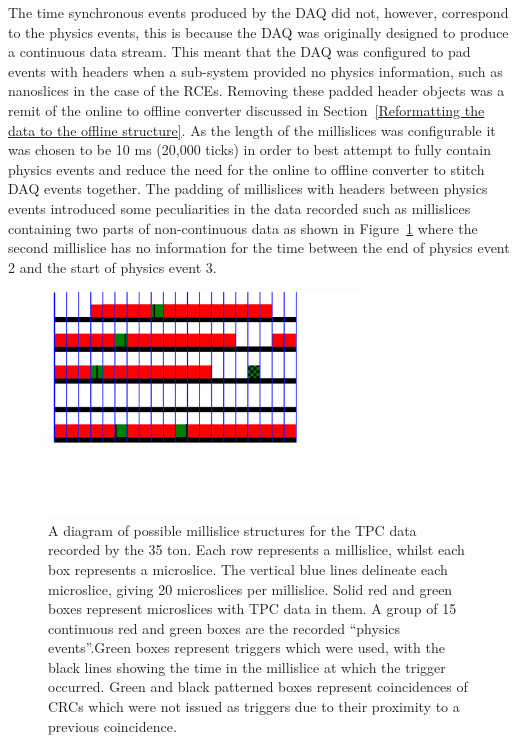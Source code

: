 The time synchronous events produced by the DAQ did not, however, correspond to the physics events, this is because the DAQ was originally designed to produce a continuous data stream. This meant that the DAQ was configured to pad events with headers when a sub-system provided no physics information, such as nanoslices in the case of the RCEs. Removing these padded header objects was a remit of the online to offline converter discussed in Section~\ref{Reformatting the data to the offline structure}. As the length of the millislices was configurable it was chosen to be 10 ms (20,000 ticks) in order to best attempt to fully contain physics events and reduce the need for the online to offline converter to stitch DAQ events together. The padding of millislices with headers between physics events introduced some peculiarities in the data recorded such as millislices containing two parts of non-continuous data as shown in Figure~\ref{fig:DataStructure} where the second millislice has no information for the time between the end of physics event 2 and the start of physics event 3.\\

\begin{figure}[h!]
  \centering
  \includegraphics[width=0.75\textwidth]{DataStructure}
  \caption[The 35 ton data structure]
          {A diagram of possible millislice structures for the TPC data recorded by the 35 ton. Each row represents a millislice, whilst each box represents a microslice. The vertical blue lines delineate each microslice, giving 20 microslices per millislice. Solid red and green boxes represent microslices with TPC data in them. A group of 15 continuous red and green boxes are the recorded ``physics events''.Green boxes represent triggers which were used, with the black lines showing the time in the millislice at which the trigger occurred. Green and black patterned boxes represent coincidences of CRCs which were not issued as triggers due to their proximity to a previous coincidence.}
  \label{fig:DataStructure}
\end{figure}

